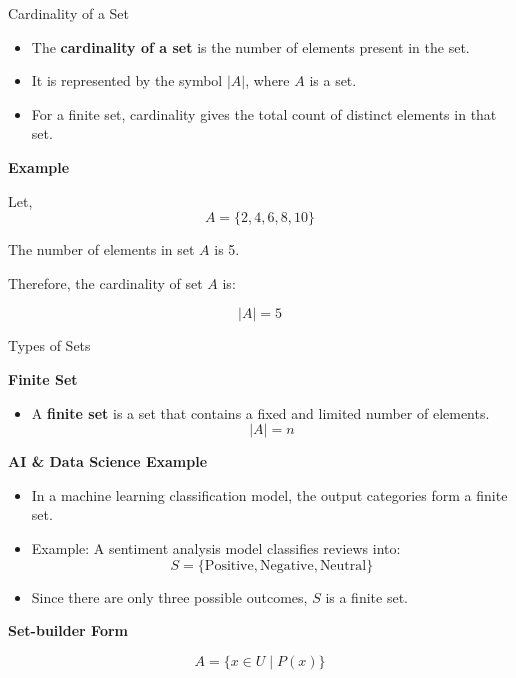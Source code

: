 \documentclass{beamer}
\begin{document}
\begin{frame}{Cardinality of a Set}


\begin{itemize}
    \item The \textbf{cardinality of a set} is the number of elements present in the set.
    \item It is represented by the symbol \(|A|\), where \(A\) is a set.
    \item For a finite set, cardinality gives the total count of distinct elements in that set.
\end{itemize}

\vspace{0.4cm}

\textbf{Example}

Let,
\[
A=\{2,4,6,8,10\}
\]

The number of elements in set \(A\) is 5.

Therefore, the cardinality of set \(A\) is:

\[
|A|=5
\]

\end{frame}
\begin{frame}{Types of Sets}

\textbf{Finite Set}

\begin{itemize}
    \item A \textbf{finite set} is a set that contains a fixed and limited number of elements.
    \[
    |A|=n
    \]
\end{itemize}

\vspace{0.3cm}

\textbf{AI \& Data Science Example}

\begin{itemize}
    \item In a machine learning classification model, the output categories form a finite set.
    \item Example: A sentiment analysis model classifies reviews into:
    \[
    S=\{\text{Positive},\text{Negative},\text{Neutral}\}
    \]
    \item Since there are only three possible outcomes, \(S\) is a finite set.
\end{itemize}

\vspace{0.3cm}

\textbf{Set-builder Form}

\[
A=\{x \in U \mid P(x)\}
\]

\end{frame}
\end{document}
